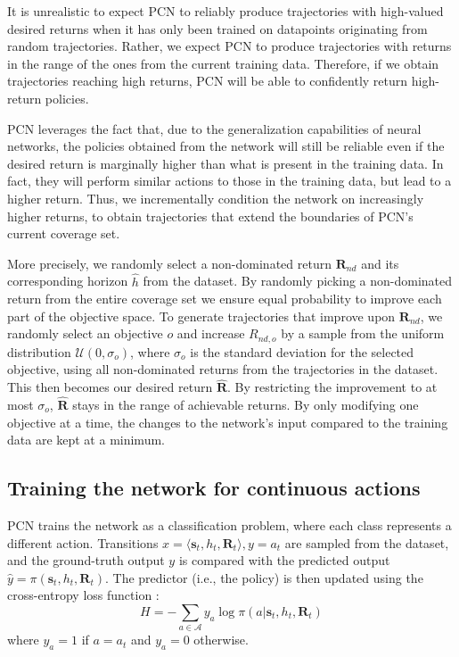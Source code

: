\documentclass{article}
\renewcommand{\cite}[1]{\citep{#1}}
\newcommand{\mdpstate}{\mathbf{s}}
\newcommand{\momdpreturn}{\mathbf{R}}
\newcommand{\action}{a}
\begin{document}
It is unrealistic to expect PCN to reliably produce trajectories with high-valued desired returns when it has only been trained on datapoints originating from random trajectories. Rather, we expect PCN to produce trajectories with returns in the range of the ones from the current training data. Therefore, if we obtain trajectories reaching high returns, PCN will be able to confidently return high-return policies.

PCN leverages the fact that, due to the generalization capabilities of neural networks, the policies obtained from the network will still be reliable even if the desired return is marginally higher than what is present in the training data. In fact, they will perform similar actions to those in the training data, but lead to a higher return. Thus, we incrementally condition the network on increasingly higher returns, to obtain trajectories that extend the boundaries of PCN's current coverage set.

More precisely, we randomly select a non-dominated return $\mathbf{R}_{nd}$ and its corresponding horizon $\hat{h}$ from the dataset. By randomly picking a non-dominated return from the entire coverage set we ensure equal probability to improve each part of the objective space. To generate trajectories that improve upon $\mathbf{R}_{nd}$, we randomly select an objective $o$ and increase $R_{nd,o}$ by a sample from the uniform distribution $\mathcal{U}(0, \sigma_o)$, where $\sigma_o$ is the standard deviation for the selected objective, using all non-dominated returns from the trajectories in the dataset. This then becomes our desired return $\bm{\hat{R}}$. By restricting the improvement to at most $\sigma_o$, $\mathbf{\hat{R}}$ stays in the range of achievable returns. By only modifying one objective at a time, the changes to the network's input compared to the training data are kept at a minimum.

\subsection{Training the network for continuous actions}
\label{sec:pcn-continuous}

PCN trains the network as a classification problem, where each class represents a different action. Transitions $x= \langle \mdpstate_t, h_t, \momdpreturn_t \rangle, y=\action_t$ are sampled from the dataset, and the ground-truth output $y$ is compared with the predicted output $\hat{y}=\pi(\mdpstate_t, h_t, \momdpreturn_t)$. The predictor (i.e., the policy) is then updated using the cross-entropy loss function \cite{shore1980axiomatic}:
\begin{equation}
    H = -\sum_{\action \in \mathcal{A}}{y_{\action} \log \pi(\action|\mdpstate_t,h_t,\momdpreturn_t)}
\end{equation}
where $y_\action = 1$ if $\action = \action_t$ and $y_\action = 0$ otherwise.
\end{document}

